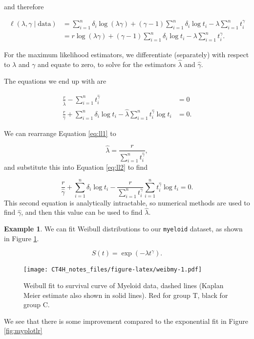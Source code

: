 \documentclass[
  openany]{book}
\theoremstyle{definition}
\theoremstyle{definition}
\newtheorem{example}{Example}[chapter]
\theoremstyle{definition}
\theoremstyle{definition}
\theoremstyle{remark}
\begin{document}
and therefore

\begin{align*}
\ell\left(\lambda,\gamma\mid{\text{data}}\right) & = \sum\limits_{i=1}^n \delta_i \log\left(\lambda\gamma\right) + \left(\gamma-1\right)\sum\limits_{i=1}^n\delta_i \log{t_i} - \lambda \sum\limits_{i=1}^n t_i^{\gamma}\\
& = r\log\left(\lambda\gamma\right) + \left(\gamma-1\right)\sum\limits_{i=1}^n \delta_i\log t_i - \lambda\sum\limits_{i=1}^n t_i^{\gamma}.
\end{align*}

For the maximum likelihood estimators, we differentiate (separately) with respect to \(\lambda\) and \(\gamma\) and equate to zero, to solve for the estimators \(\hat\lambda\) and \(\hat\gamma\).

The equations we end up with are

\begin{align}
\frac{r}{\hat{\lambda}} - \sum\limits_{i=1}^n t_i^{\hat\gamma} & = 0 \label{eq:ll1}\\
\frac{r}{\hat{\gamma}} + \sum\limits_{i=1}^n \delta_i\log t_i - \hat{\lambda}\sum\limits_{i=1}^n t_i^{\hat\gamma} \log t_i &=0 \label{eq:ll2}.
\end{align}

We can rearrange Equation \eqref{eq:ll1} to

\[\hat{\lambda} = \frac{r}{\sum\limits_{i=1}^n t_i^{\hat\gamma}},\]
and substitute this into Equation \eqref{eq:ll2} to find

\[\frac{r}{\hat{\gamma}} + \sum\limits_{i=1}^n \delta_i\log t_i - \frac{r}{\sum\limits_{i=1}^n t_i^{\gamma}}\sum\limits_{i=1}^n t_i^{\hat\gamma} \log t_i=0. \]
This second equation is analytically intractable, so numerical methods are used to find \(\hat\gamma\), and then this value can be used to find \(\hat\lambda\).

\begin{example}
We can fit Weibull distributions to our \texttt{myeloid} dataset, as shown in Figure \ref{fig:weibmy}.

\[S\left(t\right) = \exp\left(-\lambda t^{\gamma}\right).\]

\begin{figure}
\centering
\texttt{[image: CT4H\_notes\_files/figure-latex/weibmy-1.pdf]}
\caption{\label{fig:weibmy}Weibull fit to survival curve of Myeloid data, dashed lines (Kaplan Meier estimate also shown in solid lines). Red for group T, black for group C.}
\end{figure}

We see that there is some improvement compared to the exponential fit in Figure \ref{fig:myplotlr}
\end{example}
\end{document}
